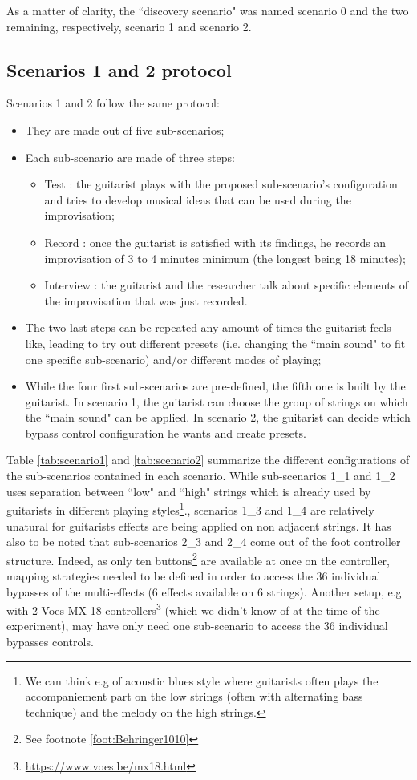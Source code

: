 \documentclass{article}
\begin{document}
As a matter of clarity, the ``discovery scenario" was named scenario 0 and the two remaining, respectively, scenario 1 and scenario 2.

\subsection{Scenarios 1 and 2 protocol}
Scenarios 1 and 2 follow the same protocol: 
\begin{itemize}
    \item They are made out of five sub-scenarios;
    \item Each sub-scenario are made of three steps: 
    \begin{itemize}
        \item Test : the guitarist plays with the proposed sub-scenario's configuration and tries to develop musical ideas that can be used during the improvisation;
        \item Record : once the guitarist is satisfied with its findings, he records an improvisation of 3 to 4 minutes minimum (the longest being 18 minutes);
        \item Interview : the guitarist and the researcher talk about specific elements of the improvisation that was just recorded.
    \end{itemize}
    \item The two last steps can be repeated any amount of times the guitarist feels like, leading to try out different presets (i.e. changing the ``main sound" to fit one specific sub-scenario) and/or different modes of playing;
    \item While the four first sub-scenarios are pre-defined, the fifth one is built by the guitarist. In scenario 1, the guitarist can choose the group of strings on which the ``main sound" can be applied. In scenario 2, the guitarist can decide which bypass control configuration he wants and create presets.
\end{itemize}

Table \ref{tab:scenario1} and \ref{tab:scenario2} summarize the different configurations of the sub-scenarios contained in each scenario.
While sub-scenarios 1\_1 and 1\_2 uses separation between ``low" and ``high" strings which is already used by guitarists in different playing styles\footnote{We can think e.g of acoustic blues style where guitarists often plays the accompaniement part on the low strings (often with alternating bass technique) and the melody on the high strings.}., scenarios 1\_3 and 1\_4 are relatively unatural for guitarists effects are being applied on non adjacent strings.
It has also to be noted that sub-scenarios 2\_3 and 2\_4 come out of the foot controller structure. Indeed, as only ten buttons\footnote{See footnote \ref{foot:Behringer1010}} are available at once on the controller, mapping strategies needed to be defined in order to access the 36 individual bypasses of the multi-effects (6 effects available on 6 strings). Another setup, e.g with 2 Voes MX-18 controllers\footnote{\href{https://www.voes.be/mx18.html}{https://www.voes.be/mx18.html}} (which we didn't know of at the time of the experiment), may have only need one sub-scenario to access the 36 individual bypasses controls.
\end{document}
